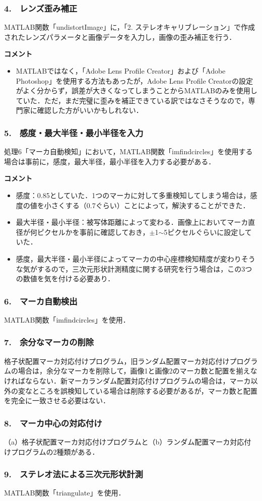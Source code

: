 \subsubsection*{4.　レンズ歪み補正}
MATLAB関数「undistortImage」に，「2. ステレオキャリブレーション」で作成されたレンズパラメータと画像データを入力し，画像の歪み補正を行う．

\newpage
\vspace{2ex}
\textbf{コメント}
\begin{itemize}
	\item MATLABではなく，「Adobe Lens Profile Creator」および「Adobe Photoshop」を使用する方法もあったが，Adobe Lens Profile Creatorの設定がよく分からず，誤差が大きくなってしまうことからMATLABのみを使用していた．ただ，まだ完璧に歪みを補正できている訳ではなさそうなので，専門家に確認した方がいいかもしれない．
\end{itemize}

\subsubsection*{5.　感度・最大半径・最小半径を入力}
処理6「マーカ自動検知」において，MATLAB関数「imfindcircles」を使用する場合は事前に，感度，最大半径，最小半径を入力する必要がある．

\vspace{2ex}
\textbf{コメント}
\begin{itemize}
	\item 感度：0.85としていた．1つのマーカに対して多重検知してしまう場合は，感度の値を小さくする（0.7ぐらい）ことによって，解決することができた．

	\item 最大半径・最小半径：被写体距離によって変わる．画像上においてマーカ直径が何ピクセルかを事前に確認しておき，$±$1$\sim$5ピクセルぐらいに設定していた．
	
	\item 感度，最大半径・最小半径によってマーカの中心座標検知精度が変わりそうな気がするので，三次元形状計測精度に関する研究を行う場合は，この3つの数値を気を付ける必要あり．
\end{itemize}

\subsubsection*{6.　マーカ自動検出}
MATLAB関数「imfindcircles」を使用．

\subsubsection*{7.　余分なマーカの削除}
格子状配置マーカ対応付けプログラム，旧ランダム配置マーカ対応付けプログラムの場合は，余分なマーカを削除して，画像1と画像2のマーカ数と配置を揃えなければならない．新マーカランダム配置対応付けプログラムの場合は，マーカ以外の変なところを誤検知している場合は削除する必要があるが，マーカ数と配置を完全に一致させる必要はない．

\subsubsection*{8.　マーカ中心の対応付け}
（a）格子状配置マーカ対応付けプログラムと（b）ランダム配置マーカ対応付けプログラムの2種類がある．

\subsubsection*{9.　ステレオ法による三次元形状計測}
MATLAB関数「triangulate」を使用．


